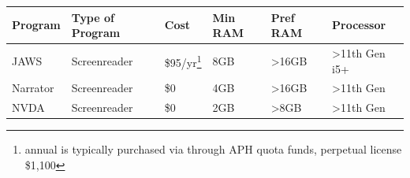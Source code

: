 \documentclass[14pt, letterpaper,twoside]{extreport}
\begin{document}
\begin{longtable}[]{@{}
	>{\raggedright\arraybackslash}p{}
	>{\raggedright\arraybackslash}p{}
	>{\raggedright\arraybackslash}p{}
	>{\raggedright\arraybackslash}p{}	
	>{\raggedright\arraybackslash}p{}
	>{\raggedright\arraybackslash}p{}
	}
	\toprule\noalign{}
	\textbf{Program}                                                                                                                                                                                                                                                                                                                  & \textbf{Type of Program}                   & \textbf{Cost} & \textbf{Min RAM} & \textbf{Pref RAM}                                                                & \textbf{Processor}       \\
	\midrule\noalign{}
	\endhead
	\bottomrule\noalign{}
	\endlastfoot
	JAWS                                                                                                                                                                                                                                                                                                                              & Screenreader                               &\$95/yr\footnote{annual is typically purchased via through APH quota funds, perpetual license \$1,100} & 8GB                  & \textgreater16GB & \textgreater11th Gen i5+ \\[1.5em]
	Narrator                                                                                                                                                                                                                                                                                                                          & Screenreader                               &\$0 & 4GB                  & \textgreater16GB                                                                      & \textgreater11th Gen     \\[1.5em]
	NVDA                                                                                                                                                                                                                                                                                                                              & Screenreader                               &\$0 & 2GB                  & \textgreater8GB                                                                       & \textgreater11th Gen     \\[1.5em]

\end{longtable}
\end{document}
